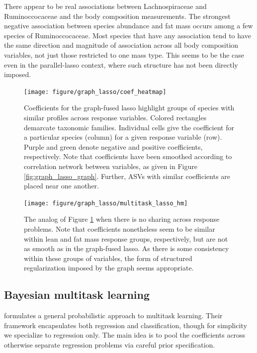 \documentclass[14pt]{extarticle}
\begin{document}
There appear to be real associations between Lachnospiraceae and Ruminoccocaceae
and the body composition measurements. The strongest negative association
between species abundance and fat mass occurs among a few species of
Ruminoccocaceae. Most species that have any association tend to have the same
direction and magnitude of association across all body composition variables,
not just those restricted to one mass type. This seems to be the case even in
the parallel-lasso context, where such structure has not been directly imposed.

\begin{figure}
  \centering
  \texttt{[image: figure/graph\_lasso/coef\_heatmap]}
  \caption{Coefficients for the graph-fused lasso highlight groups of species
    with similar profiles across response variables. Colored rectangles
    demarcate taxonomic families. Individual cells give the coefficient for a
    particular species (column) for a given response variable (row). Purple and
    green denote negative and positive coefficients, respectively. Note that
    coefficients have been smoothed according to correlation network between
    variables, as given in Figure \ref{fig:graph_lasso_graph}. Further, ASVs
    with similar coefficients are placed near one
    another. \label{fig:graph_lasso_coef_heatmap} }
\end{figure}

\begin{figure}
  \centering
  \texttt{[image: figure/graph\_lasso/multitask\_lasso\_hm]}
  \caption{The analog of Figure \ref{fig:graph_lasso_coef_heatmap} when there is
    no sharing across response problems. Note that coefficients nonetheless seem
    to be similar within lean and fat mass response groups, respectively, but
    are not as smooth as in the graph-fused lasso. As there is some consistency
    within these groups of variables, the form of structured regularization
    imposed by the graph seems
    appropriate. \label{fig:graph_lasso_multitask_lasso_hm} }
\end{figure}

\subsection{Bayesian multitask learning}
\label{subsec:bayesian_multitask}

\cite{zhang2005learning} formulates a general probabilistic approach to
multitask learning. Their framework encapsulates both regression and
classification, though for simplicity we specialize to regression only. The main
idea is to pool the coefficients across otherwise separate regression problems
via careful prior specification.
\end{document}
